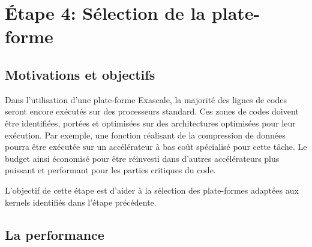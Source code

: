 
\section{Étape 4: Sélection de la plate-forme}


\subsection{Motivations et objectifs}


Dans l'utilisation d'une plate-forme Exascale, la majorité des lignes de codes seront encore exécutés sur des processeurs standard. Ces zones de codes doivent être identifiées, portées et optimisées sur des architectures optimisées pour leur exécution. Par exemple, une fonction réalisant de la compression de données pourra être exécutée sur un accélérateur à bas coût spécialisé pour cette tâche. Le budget ainsi économisé pour être réinvesti dans d'autres accélérateurs plus puissant et performant pour les parties critiques du code. 

L'objectif de cette étape est d'aider à la sélection des plate-formes adaptées aux kernels identifiés dans l'étape précédente.



\subsection{La performance}

